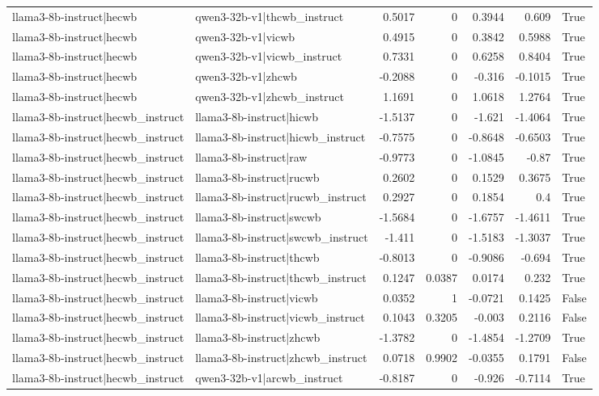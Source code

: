 \begin{table}
\begin{tabular}{l l r r r r l}
llama3-8b-instruct|hecwb & qwen3-32b-v1|thcwb_instruct & 0.5017 & 0 & 0.3944 & 0.609 & True \\
llama3-8b-instruct|hecwb & qwen3-32b-v1|vicwb & 0.4915 & 0 & 0.3842 & 0.5988 & True \\
llama3-8b-instruct|hecwb & qwen3-32b-v1|vicwb_instruct & 0.7331 & 0 & 0.6258 & 0.8404 & True \\
llama3-8b-instruct|hecwb & qwen3-32b-v1|zhcwb & -0.2088 & 0 & -0.316 & -0.1015 & True \\
llama3-8b-instruct|hecwb & qwen3-32b-v1|zhcwb_instruct & 1.1691 & 0 & 1.0618 & 1.2764 & True \\
llama3-8b-instruct|hecwb_instruct & llama3-8b-instruct|hicwb & -1.5137 & 0 & -1.621 & -1.4064 & True \\
llama3-8b-instruct|hecwb_instruct & llama3-8b-instruct|hicwb_instruct & -0.7575 & 0 & -0.8648 & -0.6503 & True \\
llama3-8b-instruct|hecwb_instruct & llama3-8b-instruct|raw & -0.9773 & 0 & -1.0845 & -0.87 & True \\
llama3-8b-instruct|hecwb_instruct & llama3-8b-instruct|rucwb & 0.2602 & 0 & 0.1529 & 0.3675 & True \\
llama3-8b-instruct|hecwb_instruct & llama3-8b-instruct|rucwb_instruct & 0.2927 & 0 & 0.1854 & 0.4 & True \\
llama3-8b-instruct|hecwb_instruct & llama3-8b-instruct|swcwb & -1.5684 & 0 & -1.6757 & -1.4611 & True \\
llama3-8b-instruct|hecwb_instruct & llama3-8b-instruct|swcwb_instruct & -1.411 & 0 & -1.5183 & -1.3037 & True \\
llama3-8b-instruct|hecwb_instruct & llama3-8b-instruct|thcwb & -0.8013 & 0 & -0.9086 & -0.694 & True \\
llama3-8b-instruct|hecwb_instruct & llama3-8b-instruct|thcwb_instruct & 0.1247 & 0.0387 & 0.0174 & 0.232 & True \\
llama3-8b-instruct|hecwb_instruct & llama3-8b-instruct|vicwb & 0.0352 & 1 & -0.0721 & 0.1425 & False \\
llama3-8b-instruct|hecwb_instruct & llama3-8b-instruct|vicwb_instruct & 0.1043 & 0.3205 & -0.003 & 0.2116 & False \\
llama3-8b-instruct|hecwb_instruct & llama3-8b-instruct|zhcwb & -1.3782 & 0 & -1.4854 & -1.2709 & True \\
llama3-8b-instruct|hecwb_instruct & llama3-8b-instruct|zhcwb_instruct & 0.0718 & 0.9902 & -0.0355 & 0.1791 & False \\
llama3-8b-instruct|hecwb_instruct & qwen3-32b-v1|arcwb_instruct & -0.8187 & 0 & -0.926 & -0.7114 & True \\

\end{tabular}
\end{table}
